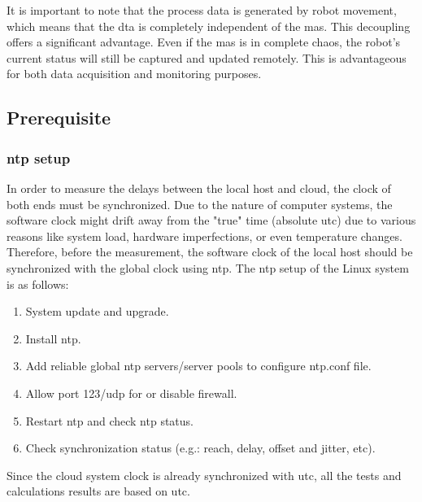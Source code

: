 It is important to note that the process data is generated by robot movement, 
which means that the \gls{dta} is completely independent of the \gls{mas}. This decoupling 
offers a 
significant advantage. Even if the \gls{mas} is in complete chaos, the robot's current status 
will still be captured and updated remotely. This is advantageous for both data acquisition 
and monitoring purposes.



\subsection{Prerequisite} \label{chap: ntpsetup}
\subsubsection{\gls{ntp} setup}
In order to measure the delays between the local host and cloud, the clock of both ends must be synchronized. 
Due to the nature of computer systems, the software clock might drift away from the "true" time (absolute \gls{utc}) 
due to various reasons like system load, hardware imperfections, or even temperature changes.
Therefore, before the measurement, the software clock of the local host should be synchronized with the global 
clock using \gls{ntp}. 
The \gls{ntp} setup of the Linux system is as follows:  

\begin{enumerate}
    \item System update and upgrade.
    \item Install \gls{ntp}.
    \item Add reliable global \gls{ntp} servers/server pools to configure ntp.conf file.
    \item Allow port 123/udp for or disable firewall.
    \item Restart \gls{ntp} and check \gls{ntp} status.
    \item Check synchronization status (e.g.: reach, delay, offset and jitter, etc).
    \end{enumerate}

Since the cloud system clock is already synchronized with \gls{utc}, all the tests and calculations results are based on \gls{utc}. 


